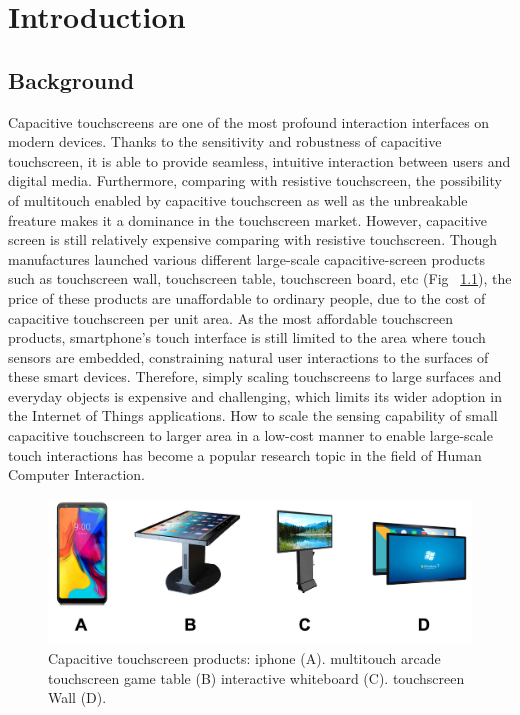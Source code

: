 \chapter{Introduction}

\section{Background}
Capacitive touchscreens are one of the most profound interaction interfaces on modern devices. Thanks to the sensitivity and robustness of capacitive touchscreen, it is able to provide seamless, intuitive interaction between users and digital media. Furthermore, comparing with resistive touchscreen, the possibility of multitouch enabled by capacitive touchscreen as well as the unbreakable freature makes it a dominance in the touchscreen market. However, capacitive screen is still relatively expensive comparing with resistive touchscreen. Though manufactures launched various different large-scale capacitive-screen products such as touchscreen wall, touchscreen table, touchscreen board, etc (Fig ~\ref{fig:touchscreen-products}), the price of these products are unaffordable to ordinary people, due to the cost of capacitive touchscreen per unit area. As the most affordable touchscreen products, smartphone's touch interface is still limited to the area where touch sensors are embedded, constraining natural user interactions to the surfaces of these smart devices. Therefore, simply scaling touchscreens to large surfaces and everyday objects is expensive and challenging, which limits its wider adoption in the Internet of Things applications. How to scale the sensing capability of small capacitive touchscreen to larger area in a low-cost manner to enable large-scale touch interactions has become a popular research topic in the field of Human Computer Interaction.

\begin{figure}[ht]
  \centering
    \includegraphics[width=0.95\columnwidth]{figures/touchproducts.png}
    \setlength{\belowcaptionskip}{-8pt}
    \caption{Capacitive touchscreen products: iphone (A). multitouch arcade touchscreen game table (B) interactive whiteboard (C). touchscreen Wall (D).}
    \label{fig:touchscreen-products}
\end{figure}

